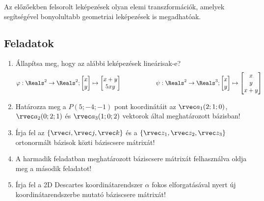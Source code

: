 \documentclass[a4paper, 12pt]{scrartcl}
\begin{document}
\begin{note}
  Az előzőekben felsorolt leképezések olyan elemi transzformációk, amelyek
  segítségével bonyolultabb geometriai leképezések is megadhatóak.
\end{note}

\clearpage
\subsection{Feladatok}
\begin{enumerate}
  \item Állapítsa meg, hogy az alábbi leképezések lineárisak-e?
        $$\displaystyle
          \varphi: \Reals^2 \to \Reals^2;
          \begin{bmatrix}
            x \\
            y
          \end{bmatrix} \mapsto \begin{bmatrix}
            x+y \\
            5xy
          \end{bmatrix}
          \hspace{2cm}
          \psi: \Reals^2 \to \Reals^3;
          \begin{bmatrix}
            x \\
            y
          \end{bmatrix} \mapsto \begin{bmatrix}
            x \\
            y \\
            x+y
          \end{bmatrix}
        $$

  \item Határozza meg a $P(5; -4; -1)$ pont koordinátáit az $\rvec a_1(2; 1;0)$,
        $\rvec a_2(0; 2; 1)$ és $\rvec a_3(1; 0; 2)$ vektorok által
        meghatározott bázisban!

  \item Írja fel az $\{ \rvec i, \rvec j, \rvec k \}$ és a $\{ \rvec z_1,
          \rvec z_2, \rvec z_3\}$ ortonormált bázisok közti báziscsere mátrixát!

  \item A harmadik feladatban meghatározott báziscsere mátrixát felhasználva
        oldja meg a második feladatot!

  \item Írja fel a 2D Descartes koordinátarendszer $\alpha$ fokos elforgatásával
        nyert új koordinátarendszerbe mutató báziscsere mátrixát!


\end{enumerate}
\end{document}
